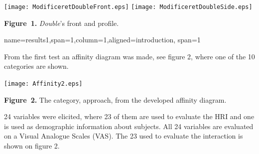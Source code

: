 \documentclass[paperwidth=118cm,paperheight=84cm,landscape,fontscale=0.2941]{baposter}
\begin{document}
\begin{poster}
{\begin{center}
\texttt{[image: ModificeretDoubleFront.eps]}
\texttt{[image: ModificeretDoubleSide.eps]}

\textbf{Figure~1. }\textit{Double}'s front and profile.
\end{center}
\vspace{-15pt}  



}


{name=results1,span=1,column=1,aligned=introduction, span=1}
{\parskip 5pt 
From the first test an affinity diagram was made, see figure 2, where one of the 10 categories are shown.
\vspace{-10pt}  
\begin{center}
	\texttt{[image: Affinity2.eps]}
	
	\textbf{Figure~2. }The category, approach, from the developed affinity diagram.
\end{center}
\vspace{-10pt}  
24 variables were elicited, where 23 of them are used to evaluate the HRI and one is used as demographic information about subjects. All 24 variables are evaluated on a Visual Analogue Scales (VAS). The 23 used to evaluate the interaction is shown on figure 2.
  
}
\end{poster}
\end{document}

